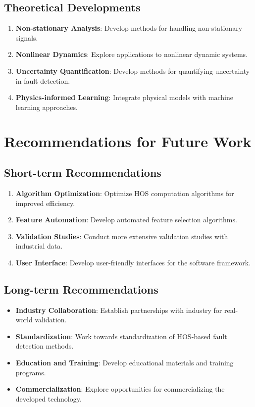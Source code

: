 \subsection{Theoretical Developments}

\begin{enumerate}
    \item \textbf{Non-stationary Analysis}: Develop methods for handling non-stationary signals.
    \item \textbf{Nonlinear Dynamics}: Explore applications to nonlinear dynamic systems.
    \item \textbf{Uncertainty Quantification}: Develop methods for quantifying uncertainty in fault detection.
    \item \textbf{Physics-informed Learning}: Integrate physical models with machine learning approaches.
\end{enumerate}

\section{Recommendations for Future Work}

\subsection{Short-term Recommendations}

\begin{enumerate}
    \item \textbf{Algorithm Optimization}: Optimize HOS computation algorithms for improved efficiency.
    \item \textbf{Feature Automation}: Develop automated feature selection algorithms.
    \item \textbf{Validation Studies}: Conduct more extensive validation studies with industrial data.
    \item \textbf{User Interface}: Develop user-friendly interfaces for the software framework.
\end{enumerate}

\subsection{Long-term Recommendations}

\begin{itemize}
    \item \textbf{Industry Collaboration}: Establish partnerships with industry for real-world validation.
    \item \textbf{Standardization}: Work towards standardization of HOS-based fault detection methods.
    \item \textbf{Education and Training}: Develop educational materials and training programs.
    \item \textbf{Commercialization}: Explore opportunities for commercializing the developed technology.
\end{itemize}

